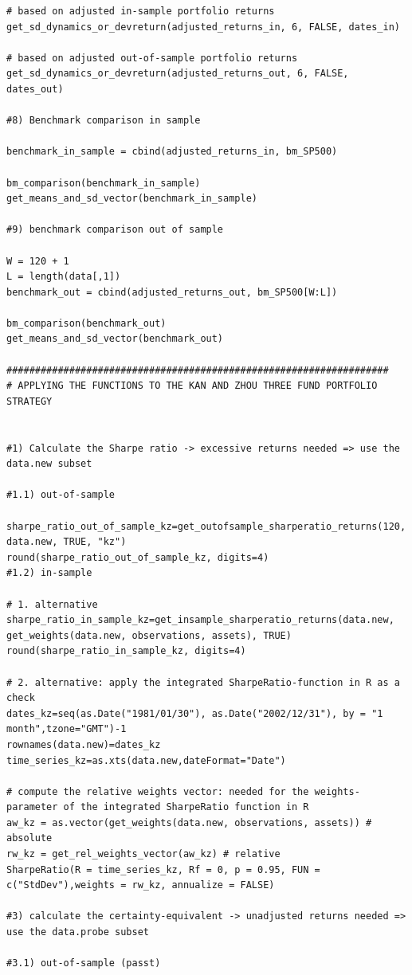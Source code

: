 \documentclass{article}
\begin{document}
\begin{lstlisting}[caption={This listing shows the entire code developed in R.}, label=code:1,frame=single]
# based on adjusted in-sample portfolio returns
get_sd_dynamics_or_devreturn(adjusted_returns_in, 6, FALSE, dates_in)

# based on adjusted out-of-sample portfolio returns
get_sd_dynamics_or_devreturn(adjusted_returns_out, 6, FALSE, dates_out)

#8) Benchmark comparison in sample 

benchmark_in_sample = cbind(adjusted_returns_in, bm_SP500)

bm_comparison(benchmark_in_sample)
get_means_and_sd_vector(benchmark_in_sample)

#9) benchmark comparison out of sample 

W = 120 + 1
L = length(data[,1])
benchmark_out = cbind(adjusted_returns_out, bm_SP500[W:L])

bm_comparison(benchmark_out)
get_means_and_sd_vector(benchmark_out)

###################################################################
# APPLYING THE FUNCTIONS TO THE KAN AND ZHOU THREE FUND PORTFOLIO STRATEGY


#1) Calculate the Sharpe ratio -> excessive returns needed => use the data.new subset

#1.1) out-of-sample

sharpe_ratio_out_of_sample_kz=get_outofsample_sharperatio_returns(120, data.new, TRUE, "kz")
round(sharpe_ratio_out_of_sample_kz, digits=4)
#1.2) in-sample

# 1. alternative
sharpe_ratio_in_sample_kz=get_insample_sharperatio_returns(data.new, get_weights(data.new, observations, assets), TRUE)
round(sharpe_ratio_in_sample_kz, digits=4)

# 2. alternative: apply the integrated SharpeRatio-function in R as a check
dates_kz=seq(as.Date("1981/01/30"), as.Date("2002/12/31"), by = "1 month",tzone="GMT")-1
rownames(data.new)=dates_kz
time_series_kz=as.xts(data.new,dateFormat="Date")

# compute the relative weights vector: needed for the weights-parameter of the integrated SharpeRatio function in R
aw_kz = as.vector(get_weights(data.new, observations, assets)) # absolute
rw_kz = get_rel_weights_vector(aw_kz) # relative
SharpeRatio(R = time_series_kz, Rf = 0, p = 0.95, FUN = c("StdDev"),weights = rw_kz, annualize = FALSE)

#3) calculate the certainty-equivalent -> unadjusted returns needed => use the data.probe subset

#3.1) out-of-sample (passt)


\end{lstlisting}
\end{document}
